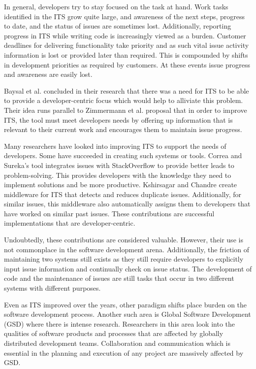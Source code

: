 \documentclass{mproj}
\begin{document}
In general, developers try to stay focused on the task at hand. Work tasks identified in the ITS grow quite large, and awareness of the next steps, progress to date, and the status of issues are sometimes lost. Additionally, reporting progress in ITS while writing code is increasingly viewed as a burden. Customer deadlines for delivering functionality take priority and as such vital issue activity information is lost or provided later than required. This is compounded by shifts in development priorities as required by customers. At these events issue progress and awareness are easily lost.

Baysal et al. \cite{Baysal:2013} concluded in their research that there was a need for ITS to be able to provide a developer-centric focus which would help to alliviate this problem. Their  idea runs parallel to Zimmermann et al. \cite{Zimmermann:2009} proposal that in order to improve ITS, the tool must meet developers needs by offering up information that is relevant to their current work and encourages them to maintain issue progress.

Many researchers have looked into improving ITS to support the needs of developers. Some have succeeded in creating such systems or tools. Correa and Sureka’s \cite{Correa:2013} tool integrates issues with StackOverflow to provide better leads to problem-solving. This provides developers with the knowledge they need to implement solutions and be more productive. Kshirsagar and Chandre \cite{Kshirsagar:2015} create middleware for ITS that detects and reduces duplicate issues. Additionally, for similar issues, this middleware also automatically assigns them to developers that have worked on similar past issues. These contributions are successful implementations that are developer-centric.

Undoubtedly, these contributions are considered valuable. However, their use is not commonplace in the software development arena. Additionally, the friction of maintaining two systems still exists as they still require developers to explicitly input issue information and continually check on issue status. The development of code and the maintenance of issues are still tasks that occur in two different systems with different purposes.

Even as ITS improved over the years, other paradigm shifts place burden on the software development process. Another such area is Global Software Development (GSD) where there is intense research. Researchers in this area look into the qualities of software products and processes that are affected by globally distributed development teams. Collaboration and communication which is essential in the planning and execution of any project are massively affected by GSD.
\end{document}

